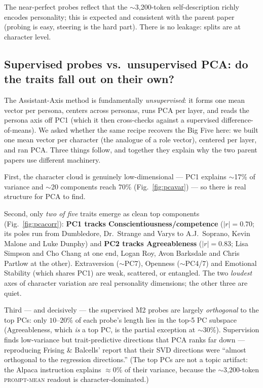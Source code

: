 \documentclass[11pt]{article}
\begin{document}
The near-perfect probes reflect that the $\sim$3{,}200-token self-description
richly encodes personality; this is expected and consistent with the parent paper
(probing is easy, steering is the hard part). There is no leakage: splits are at
character level.

\subsection{Supervised probes vs.\ unsupervised PCA: do the traits fall out on their own?}
\label{sec:pca}
The Assistant-Axis method is fundamentally \emph{unsupervised}: it forms one
mean vector per persona, centers across personas, runs PCA per layer, and reads
the persona axis off PC1 (which it then cross-checks against a supervised
difference-of-means). We asked whether the same recipe recovers the Big Five
here: we built one mean vector per character (the analogue of a role vector),
centered per layer, and ran PCA. Three things follow, and together they explain
why the two parent papers use different machinery.

First, the character cloud is genuinely low-dimensional --- PC1 explains
$\sim$17\% of variance and $\sim$20 components reach 70\%
(Fig.~\ref{fig:pcavar}) --- so there is real structure for PCA to find.

Second, only \emph{two of five} traits emerge as clean top components
(Fig.~\ref{fig:pcacorr}): \textbf{PC1 tracks Conscientiousness/competence}
($|r|{=}0.70$; its poles run from Dumbledore, Dr.\ Strange and Varys to
A.J.\ Soprano, Kevin Malone and Luke Dunphy) and \textbf{PC2 tracks
Agreeableness} ($|r|{=}0.83$; Lisa Simpson and Cho Chang at one end,
Logan Roy, Avon Barksdale and Chris Partlow at the other). Extraversion
($\sim$PC7), Openness ($\sim$PC4/7) and Emotional Stability (which shares PC1)
are weak, scattered, or entangled. The two \emph{loudest} axes of character
variation are real personality dimensions; the other three are quiet.

Third --- and decisively --- the supervised M2 probes are largely
\emph{orthogonal} to the top PCs: only $10$--$20\%$ of each probe's length lies
in the top-5 PC subspace (Agreeableness, which \emph{is} a top PC, is the
partial exception at $\sim$30\%). Supervision finds low-variance but
trait-predictive directions that PCA ranks far down --- reproducing Frising \&
Balcells' report that their SVD directions were ``almost orthogonal to the
regression directions.'' (The top PCs are not a topic artifact: the Alpaca
instruction explains $\approx$0\% of their variance, because the
$\sim$3{,}200-token \textsc{prompt-mean} readout is character-dominated.)
\end{document}
